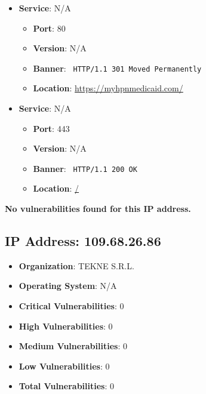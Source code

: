 \documentclass{article}
\begin{document}
\begin{itemize}
    
        \item \textbf{Service}: N/A
        \begin{itemize}
            \item \textbf{Port}: 80
            \item \textbf{Version}:  N/A 
            \item \textbf{Banner}: \texttt{
                HTTP/1.1 301 Moved Permanently
            }
            \item \textbf{Location}: \href{ https://myhpnmedicaid.com/ }{ https://myhpnmedicaid.com/ }
        \end{itemize}
    
        \item \textbf{Service}: N/A
        \begin{itemize}
            \item \textbf{Port}: 443
            \item \textbf{Version}:  N/A 
            \item \textbf{Banner}: \texttt{
                HTTP/1.1 200 OK
            }
            \item \textbf{Location}: \href{ / }{ / }
        \end{itemize}
    
\end{itemize}


\textbf{No vulnerabilities found for this IP address.}




\clearpage



\subsection*{IP Address: 109.68.26.86}

\begin{itemize}
    \item \textbf{Organization}: TEKNE S.R.L.
    \item \textbf{Operating System}:  N/A 
    \item \textbf{Critical Vulnerabilities}: 0
    \item \textbf{High Vulnerabilities}: 0
    \item \textbf{Medium Vulnerabilities}: 0
    \item \textbf{Low Vulnerabilities}: 0
    \item \textbf{Total Vulnerabilities}: 0
\end{itemize}
\end{document}

